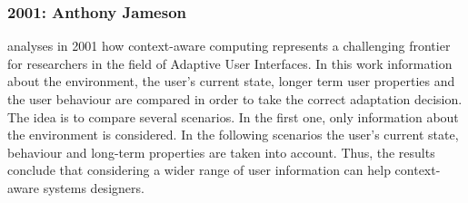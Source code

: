 \subsubsection{2001: Anthony Jameson}
\label{sec:jameson}

\citet{jameson_modelling_2001} analyses in 2001 how context-aware computing 
represents a challenging frontier for researchers in the field of Adaptive User 
Interfaces. In this work information about the environment, the user's current 
state, longer term user properties and the user behaviour are compared in order 
to take the correct adaptation decision. The idea is to compare several 
scenarios. In the first one, only information about the environment is 
considered. In the following scenarios the user's current state, behaviour and 
long-term properties are taken into account. Thus, the results conclude 
that considering a wider range of user information can help context-aware 
systems designers.

% 
% 
% 


